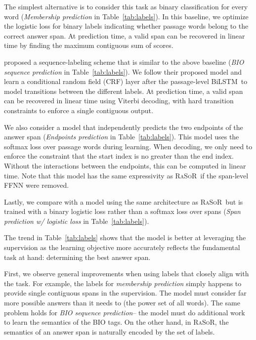 \documentclass{article} \usepackage{iclr2017_conference,times}
\newcommand{\bilstm}{BiLSTM}
\newcommand{\ourmodel}{\textsc{RaSoR}}
\begin{document}
The simplest alternative is to consider this task as binary classification for every word (\textit{Membership prediction} in Table~\ref{tab:labels}). In this baseline, we optimize the logistic loss for binary labels indicating whether passage words belong to the correct answer span.
At prediction time, a valid span can be recovered in linear time by finding the maximum contiguous sum of scores.

\cite{li2016dataset} proposed a sequence-labeling scheme that is similar to the above baseline (\textit{BIO sequence prediction} in Table~\ref{tab:labels}).
We follow their proposed model and learn a conditional random field (CRF) layer after the passage-level \bilstm~to model transitions between the different labels.
At prediction time, a valid span can be recovered in linear time using Viterbi decoding, with hard transition constraints to enforce a single contiguous output.

We also consider a model that independently predicts the two endpoints of the answer span (\textit{Endpoints prediction} in Table~\ref{tab:labels}).
This model uses the softmax loss over passage words during learning.
When decoding, we only need to enforce the constraint that the start index is no greater than the end index.
Without the interactions between the endpoints, this can be computed in linear time.
Note that this model has the same expressivity as \ourmodel~if the span-level FFNN were removed.

Lastly, we compare with a model using the same architecture as \ourmodel~but is trained with a binary logistic loss rather than a softmax loss over spans (\textit{Span prediction w/ logistic loss} in Table~\ref{tab:labels}).

The trend in Table~\ref{tab:labels} shows that the model is better at leveraging the supervision as the learning objective more accurately reflects the fundamental task at hand: determining the best answer span.

First, we observe general improvements when using labels that closely align with the task.
For example, the labels for \textit{membership prediction} simply happens to provide single contiguous spans in the supervision.
The model must consider far more possible answers than it needs to (the power set of all words).
The same problem holds for \textit{BIO sequence prediction}-- the model must do additional work to learn the semantics of the BIO tags.
On the other hand, in \ourmodel, the semantics of an answer span is naturally encoded by the set of labels.
\end{document}

